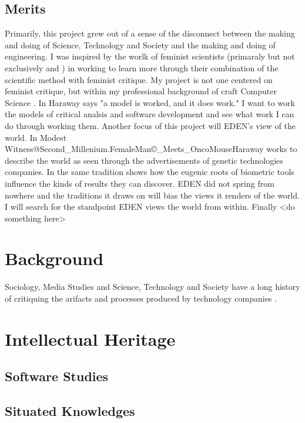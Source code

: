 \documentclass[a4paper,man,natbib]{apa6}
\begin{document}
   \subsection*{Merits}
   Primarily, this project grew out of a sense of the disconnect between the making and doing of Science, Technology and Society and the making and doing of engineering. I was inspired by the worlk of feminist scientists (primaraly but not exclusively \citet{Roy2018-ma} and \citet{Subramaniam2014-wg}) in working to learn more through their combination of the scientific method with feminist critique. My project is not one centered on feminist critique, but within my professional background of craft Computer Science \citep[see][]{Ensmenger2012-kz}. In \citet[p. 63]{Haraway2016-nc} Haraway says "a model is worked, and it does work." I want to work the models of critical analsis and software development and see what work I can do through working them.
   Another focus of this project will EDEN's view of the world. In Modest Witness@Second\_Millenium.FemaleMan\copyright\_Meets\_OncoMouse\texttrademark Haraway works to describe the world as seen through the advertisements of genetic technologies companies. In the same tradition \citet{Subramaniam2014-wg} shows how the eugenic roots of biometric tools influence the kinds of results they can discover. EDEN did not spring from nowhere and the traditions it draws on will bias the views it renders of the world. I will search for the standpoint \citet{Haraway1993-kw} EDEN views the world from within.
   Finally <do something here>
   \section*{Background}
   Sociology, Media Studies and Science, Technology and Society have a long history of critiquing the arifacts and processes produced by technology companies \citep{Cheney-Lippold2018-lw,Dean2010-lk,Harraway1997-va}.  
   \section*{Intellectual Heritage}
   \subsection*{Software Studies}
   \subsection*{Situated Knowledges}
\end{document}
